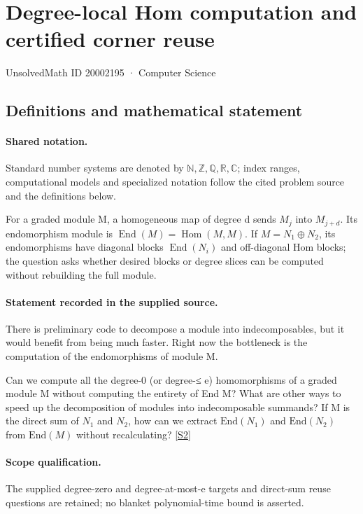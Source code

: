 \documentclass[11pt]{article}
\newcommand{\sref}[2]{\hyperlink{source:#1:#2}{[S#2]}}
\begin{document}
\setcounter{section}{20002194}
\section{Degree-local Hom computation and certified corner reuse}\label{20002195}
{\small\sffamily UnsolvedMath ID 20002195 · Computer Science}
\subsection{Definitions and mathematical statement}

\paragraph{Shared notation.}Standard number systems are denoted by $\mathbb N,\mathbb Z,\mathbb Q,\mathbb R,\mathbb C$; index ranges, computational models and specialized notation follow the cited problem source and the definitions below.


For a graded module M, a homogeneous map of degree d sends $M_j$ into $M_{j+d}$. Its endomorphism module is $\operatorname{End}(M)=\operatorname{Hom}(M,M)$. If $M=N_1\oplus N_2$, its endomorphisms have diagonal blocks $\operatorname{End}(N_i)$ and off-diagonal Hom blocks; the question asks whether desired blocks or degree slices can be computed without rebuilding the full module.
\paragraph{Statement recorded in the supplied source.}
There is preliminary code to decompose a module into indecomposables, but it would benefit from being much faster. Right now the bottleneck is the computation of the endomorphisms of module M.

Can we compute all the degree-0 (or degree-≤ e) homomorphisms of a graded module M without computing the entirety of End M? What are other ways to speed up the decomposition of modules into indecomposable summands? If M is the direct sum of $N_1$ and $N_2$, how can we extract $\mathrm{End}(N_1)$ and $\mathrm{End}(N_2)$ from $\mathrm{End}(M)$ without recalculating? \sref{20002195}{2}
\paragraph{Scope qualification.}
The supplied degree-zero and degree-at-most-e targets and direct-sum reuse questions are retained; no blanket polynomial-time bound is asserted.
\end{document}

